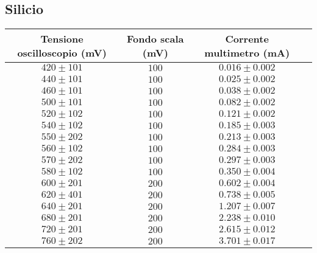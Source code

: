 \documentclass[]{article}
\begin{document}
\subsection{Silicio}
\begin{center}
	\begin{tabular}{|c|c|c|c|}
		\hline
		Tensione oscilloscopio (mV)& Fondo scala (mV) & Corrente multimetro (mA) \\
		\hline
		$ 420\pm 101 $ &$ 100 $ & $ 0.016\pm 0.002 $ \\
		\hline
		$440\pm101 $ &$ 100 $ & $ 0.025\pm0.002 $ \\
		\hline
		$ 460\pm 101 $ &$ 100 $ & $ 0.038\pm 0.002 $ \\
		\hline
		$ 500\pm 101 $ &$ 100 $ & $ 0.082\pm 0.002 $ \\
		\hline
		$ 520\pm 102 $ &$ 100 $ & $0.121\pm 0.002$ \\
		\hline
		$ 540\pm 102 $ &$ 100 $ & $ 0.185\pm 0.003 $ \\
		\hline
		$ 550\pm 202 $ &$ 100 $ & $ 0.213\pm 0.003 $ \\
		\hline
		$ 560\pm 102 $ &$ 100 $ & $ 0.284\pm 0.003 $ \\
		\hline
		$ 570\pm 202 $ &$ 100 $ & $ 0.297\pm 0.003 $ \\
		\hline
		$ 580\pm 102 $ &$ 100 $ & $ 0.350\pm 0.004 $ \\
		\hline
		$ 600\pm 201 $ &$ 200 $ & $ 0.602\pm0.004 $ \\
		\hline
		$ 620\pm 401 $ &$ 200 $ & $ 0.738\pm0.005 $ \\
		\hline
		$ 640\pm 201 $ &$ 200 $ & $ 1.207\pm0.007 $ \\
		\hline
		$ 680\pm 201 $ &$ 200 $ & $ 2.238\pm 0.010 $ \\
		\hline
		$ 720\pm 201 $ &$ 200 $ & $ 2.615\pm 0.012 $ \\
		\hline
		$ 760\pm 202 $ &$ 200 $ & $ 3.701\pm 0.017 $ \\
		\hline
			\end{tabular}
	\end{center}
\end{document}
